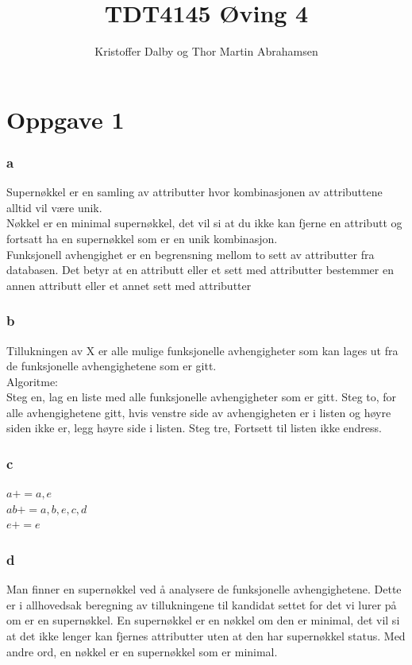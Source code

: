 \documentclass[a4paper, 10pt]{article}
\title{TDT4145 Øving 4}
\author{Kristoffer Dalby og Thor Martin Abrahamsen}
\date{}
\begin{document}
\maketitle

\thispagestyle{empty}
\newpage
{}
\setcounter{page}{1}

\section*{Oppgave 1}

\subsubsection*{a}
Supernøkkel er en samling av attributter hvor kombinasjonen av attributtene alltid vil være unik.\\
Nøkkel er en minimal supernøkkel, det vil si at du ikke kan fjerne en attributt og fortsatt ha en supernøkkel som er en unik kombinasjon.\\
Funksjonell avhengighet er en begrensning mellom to sett av attributter fra databasen. Det betyr at en attributt eller et sett med attributter bestemmer en annen attributt eller et annet sett med attributter\\

\subsubsection*{b}
Tillukningen av X er alle mulige funksjonelle avhengigheter som kan lages ut fra de funksjonelle avhengighetene som er gitt.\\

Algoritme:\\
Steg en, lag en liste med alle funksjonelle avhengigheter som er gitt.
Steg to, for alle avhengighetene gitt, hvis venstre side av avhengigheten er i listen og høyre siden ikke er, legg høyre side i listen.
Steg tre, Fortsett til listen ikke endress.

\subsubsection*{c}
$a+ = {a, e}$\\
$ab+ = {a, b, e, c, d}$\\
$e+ = {e}$

\subsubsection*{d}
Man finner en supernøkkel ved å analysere de funksjonelle avhengighetene. Dette er i allhovedsak beregning av tillukningene til kandidat settet for det vi lurer på om er en supernøkkel.
En supernøkkel er en nøkkel om den er minimal, det vil si at det ikke lenger kan fjernes attributter uten at den har supernøkkel status. Med andre ord, en nøkkel er en supernøkkel som er minimal.
\end{document}
